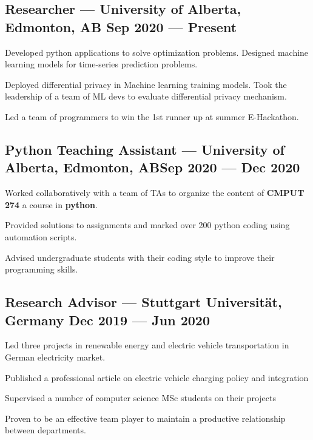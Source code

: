 \documentclass[letter,11pt]{article}
\begin{document}
\subsection{{Researcher --- University of Alberta, Edmonton, AB \hfill Sep 2020 --- Present}}
\begin{zitemize}
	\item Developed python applications to solve optimization problems. Designed machine learning models for time-series prediction problems.
	\item Deployed differential privacy in Machine learning training models. Took the leadership of a team of ML devs to evaluate differential privacy mechanism.
	\item Led a team of programmers to win the 1st runner up at summer E-Hackathon.

\end{zitemize}

\subsection{{Python Teaching Assistant --- University of Alberta, Edmonton, AB\hfill Sep 2020 --- Dec 2020}}
\begin{zitemize}
	\item Worked collaboratively with a team of TAs to organize the content of \textbf{CMPUT 274} a course in \textbf{python}.
	\item Provided solutions to assignments and marked over 200 python coding  using automation scripts.
	\item Advised undergraduate students with their coding style to improve their programming skills.
\end{zitemize}
\subsection{{ Research Advisor --- Stuttgart Universität, Germany \hfill Dec 2019 --- Jun 2020}}
\begin{zitemize}
	\item Led three projects in renewable energy and electric vehicle transportation in German electricity market.
	\item Published a professional article on electric vehicle charging policy and integration
	\item Supervised a number of computer science MSc students on their projects 
	\item Proven to be an effective team player to maintain a productive relationship between departments.
\end{zitemize}
\end{document}
